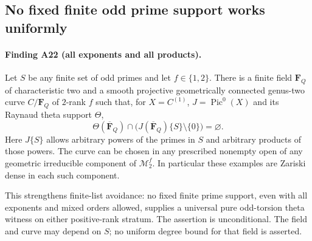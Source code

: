 \subsection{No fixed finite odd prime support works uniformly}
\label{sec:no-fixed-prime-support}

\paragraph{Finding A22 (all exponents and all products).}
Let $S$ be any finite set of odd primes and let
$f\in\{1,2\}$.  There is a finite field $\mathbf F_Q$ of
characteristic two and a smooth projective geometrically
connected genus-two curve $C/\mathbf F_Q$ of $2$-rank $f$
such that, for $X=C^{(1)}$, $J=\operatorname{Pic}^0(X)$ and
its Raynaud theta support $\Theta$,
\[
       \Theta(\overline{\mathbf F}_Q)\cap
       \bigl(J(\overline{\mathbf F}_Q)\{S\}\setminus\{0\}\bigr)
                         =\varnothing.                       \tag{SA.1}
\]
Here $J\{S\}$ allows arbitrary powers of the primes in
$S$ and arbitrary products of those powers.
The curve can be chosen in any prescribed nonempty open
of any geometric irreducible component of
$\mathcal M_2^f$.  In particular these examples are
Zariski dense in each such component.

This strengthens finite-list avoidance: no fixed finite
prime support, even with all exponents and mixed orders
allowed, supplies a universal pure odd-torsion theta
witness on either positive-rank stratum.  The assertion
is unconditional.  The field and curve may depend on $S$;
no uniform degree bound for that field is asserted.

